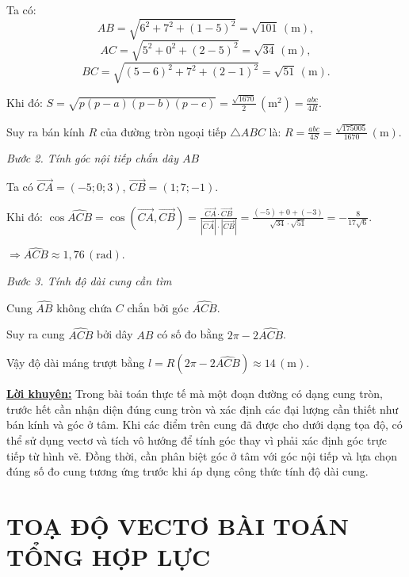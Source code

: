 \documentclass[12pt,a4paper,oneside]{book}
\theoremstyle{theorem}
\theoremstyle{definition}
\begin{document}
        Ta có:
        $$AB=\sqrt{6^2+7^2+(1-5)^2}=\sqrt{101}\,(\mathrm{m}),$$
        $$AC=\sqrt{5^2+0^2+(2-5)^2}=\sqrt{34}\,(\mathrm{m}),$$
        $$BC=\sqrt{(5-6)^2+7^2+(2-1)^2}=\sqrt{51}\,(\mathrm{m}).$$
        
        Khi đó: $S=\sqrt{p(p-a)(p-b)(p-c)}
        =\displaystyle \frac{\sqrt{1670}}{2}\,(\mathrm{m}^2)
        =\frac{abc}{4R}.$
        
        Suy ra bán kính $R$ của đường tròn ngoại tiếp $\triangle ABC$ là:
        $R=\displaystyle \frac{abc}{4S}
        =\frac{\sqrt{175005}}{1670}\,(\mathrm{m}).$
        
        \noindent \textit{Bước 2. Tính góc nội tiếp chắn dây $AB$}
        
        Ta có $\overrightarrow{CA}=(-5;0;3)$, $\overrightarrow{CB}=(1;7;-1)$.
        
        Khi đó:
        $\cos\widehat{ACB}
        =\cos(\overrightarrow{CA},\overrightarrow{CB})
        =\displaystyle \frac{\overrightarrow{CA}\cdot\overrightarrow{CB}}
        {|\overrightarrow{CA}|\cdot|\overrightarrow{CB}|}
        =\frac{(-5)+0+(-3)}
        {\sqrt{34}\cdot\sqrt{51}}
        =-\frac{8}{17\sqrt{6}}.$
        
        $\Rightarrow \widehat{ACB}\approx1,76\,(\mathrm{rad}).$
        
        \noindent \textit{Bước 3. Tính độ dài cung cần tìm}
        
        Cung $\widehat{AB}$ không chứa $C$ chắn bởi góc $\widehat{ACB}$.
        
        Suy ra cung $\widehat{ACB}$ bởi dây $AB$ có số đo bằng $2\pi-2\widehat{ACB}$.
        
        Vậy độ dài máng trượt bằng
        $l=R(2\pi-2\widehat{ACB})\approx14\,(\mathrm{m}).$
    
    \noindent \underline{\textbf{Lời khuyên:}} Trong  bài toán thực tế mà một đoạn đường có dạng cung tròn, trước hết cần nhận diện đúng cung tròn và xác định các đại lượng cần thiết như bán kính và góc ở tâm. Khi các điểm trên cung đã được cho dưới dạng tọa độ, có thể sử dụng vectơ và tích vô hướng để tính góc thay vì phải xác định góc trực tiếp từ hình vẽ. Đồng thời, cần phân biệt góc ở tâm với góc nội tiếp và lựa chọn đúng số đo cung tương ứng trước khi áp dụng công thức tính độ dài cung.
    \chapter{TOẠ ĐỘ VECTƠ BÀI TOÁN TỔNG HỢP LỰC}
\end{document}

